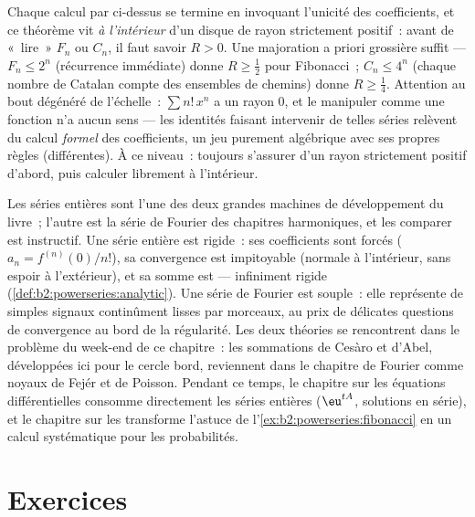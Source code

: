 \begin{remark}
Chaque calcul par  ci-dessus se termine en invoquant
l'unicité des coefficients, et ce théorème vit
\emph{à l'intérieur} d'un disque de rayon strictement positif~: avant
de «~lire~» $F_n$ ou $C_n$, il faut savoir $R > 0$. Une majoration
a priori grossière suffit --- $F_n \leq 2^n$ (récurrence immédiate)
donne $R \geq \frac12$ pour Fibonacci~; $C_n \leq 4^n$ (chaque nombre
de Catalan compte des ensembles de chemins) donne $R \geq \frac14$.
Attention au bout dégénéré de l'échelle~: $\sum n!\,x^n$ a un rayon $0$,
et le manipuler comme une fonction n'a aucun sens --- les identités
faisant intervenir de telles séries relèvent du calcul \emph{formel} des
coefficients, un jeu purement algébrique avec ses propres règles
(différentes). À ce niveau~: toujours s'assurer d'un rayon strictement
positif d'abord, puis calculer librement à l'intérieur.
\end{remark}

\begin{remark}
Les séries entières sont l'une des deux grandes machines de
développement du livre~; l'autre est la série de Fourier des
chapitres harmoniques, et les comparer est instructif. Une série
entière est rigide~: ses coefficients sont forcés ($a_n = f^{(n)}(0)/n!$),
sa convergence est impitoyable (normale à l'intérieur, sans espoir à
l'extérieur), et sa somme est  --- infiniment rigide
(\cref{def:b2:powerseries:analytic}). Une série de Fourier est
souple~: elle représente de simples signaux continûment lisses par
morceaux, au prix de délicates questions de convergence au bord de la
régularité. Les deux théories se rencontrent dans le problème du
week-end de ce chapitre~: les sommations de Cesàro et d'Abel,
développées ici pour le cercle bord, reviennent dans le chapitre de
Fourier comme noyaux de Fejér et de Poisson. Pendant ce temps, le
chapitre sur les équations différentielles consomme directement les
séries entières ($\eu^{tA}$, solutions en série), et le chapitre sur
les  transforme l'astuce de
l'\cref{ex:b2:powerseries:fibonacci} en un calcul systématique
pour les probabilités.
\end{remark}

\section{Exercices}


